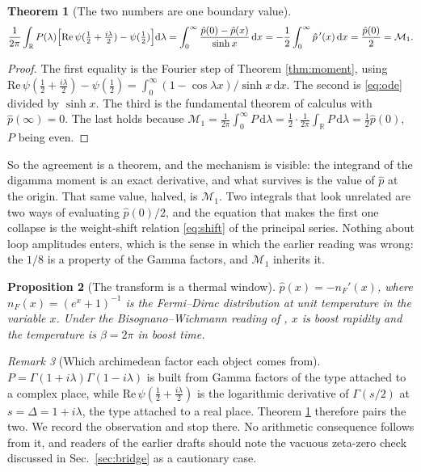 \documentclass[12pt,a4paper]{article}
\theoremstyle{plain}
\newtheorem{theorem}{Theorem}[section]
\newtheorem{proposition}[theorem]{Proposition}
\theoremstyle{definition}
\theoremstyle{remark}
\newtheorem{remark}[theorem]{Remark}
\newcommand{\R}{\mathbb{R}}
\newcommand{\dd}{\mathrm{d}}
\begin{document}
\begin{theorem}[The two numbers are one boundary value]
\label{thm:resolved}
\begin{equation}
\frac{1}{2\pi}\int_\R P(\lambda)\Bigl[\mathrm{Re}\,\psi(\tfrac12+\tfrac{i\lambda}{2})-\psi(\tfrac12)\Bigr]\dd\lambda
=\int_0^\infty\frac{\hat p(0)-\hat p(x)}{\sinh x}\,\dd x
=-\frac12\int_0^\infty \hat p\,'(x)\,\dd x
=\frac{\hat p(0)}{2}
=\mathcal M_1 .
\label{eq:resolved}
\end{equation}
\end{theorem}

\begin{proof}
The first equality is the Fourier step of Theorem \ref{thm:moment},
using
$\mathrm{Re}\,\psi(\tfrac12+\tfrac{i\lambda}{2})-\psi(\tfrac12)
=\int_0^\infty(1-\cos\lambda x)/\sinh x\,\dd x$.
The second is \eqref{eq:ode} divided by $\sinh x$. The third is the
fundamental theorem of calculus with $\hat p(\infty)=0$. The last holds
because $\mathcal M_1=\tfrac{1}{2\pi}\int_0^\infty P\,\dd\lambda
=\tfrac12\cdot\tfrac{1}{2\pi}\int_\R P\,\dd\lambda=\tfrac12\hat p(0)$,
$P$ being even.
\end{proof}

So the agreement is a theorem, and the mechanism is visible: the
integrand of the digamma moment is an exact derivative, and what
survives is the value of $\hat p$ at the origin. That same value, halved,
is $\mathcal M_1$. Two integrals that look unrelated are two ways of
evaluating $\hat p(0)/2$, and the equation that makes the first one
collapse is the weight-shift relation \eqref{eq:shift} of the principal
series. Nothing about loop amplitudes enters, which is the sense in
which the earlier reading was wrong: the $1/8$ is a property of the
Gamma factors, and $\mathcal M_1$ inherits it.

\begin{proposition}[The transform is a thermal window]
\label{prop:fermi}
$\hat p(x)=-n_F'(x)$, where $n_F(x)=(e^x+1)^{-1}$ is the Fermi--Dirac
distribution at unit temperature in the variable $x$. Under the
Bisognano--Wichmann reading of \cite{ToupinSpectral}, $x$ is boost
rapidity and the temperature is $\beta=2\pi$ in boost time.
\end{proposition}

\begin{remark}[Which archimedean factor each object comes from]
$P=\Gamma(1+i\lambda)\Gamma(1-i\lambda)$ is built from Gamma factors of
the type attached to a complex place, while
$\mathrm{Re}\,\psi(\tfrac12+\tfrac{i\lambda}{2})$ is the logarithmic
derivative of $\Gamma(s/2)$ at $s=\Delta=1+i\lambda$, the type attached
to a real place. Theorem \ref{thm:resolved} therefore pairs the two.
We record the observation and stop there. No arithmetic consequence
follows from it, and readers of the earlier drafts should note the
vacuous zeta-zero check discussed in Sec.~\ref{sec:bridge} as a
cautionary case.
\end{remark}
\end{document}
